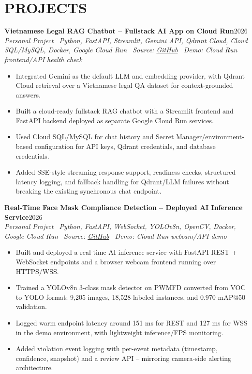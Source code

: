 \documentclass[10pt,a4paper]{article}
\newenvironment{cvitems}{%
    \begin{itemize}[leftmargin=1.2em,itemsep=0pt,topsep=1pt,parsep=0pt]
}{%
    \end{itemize}
}
\newcommand{\entryhead}[2]{%
    \noindent\textbf{#1}\hfill #2\\[-2pt]
}
\newcommand{\entrysub}[1]{%
    \noindent\textit{#1}\\[-1pt]
}
\begin{document}
\section{PROJECTS}
\entryhead{Vietnamese Legal RAG Chatbot -- Fullstack AI App on Cloud Run}{2026}
\entrysub{Personal Project \textbar\ Python, FastAPI, Streamlit, Gemini API, Qdrant Cloud, Cloud SQL/MySQL, Docker, Google Cloud Run \textbar\ Source: \href{https://github.com/NguyenKhacBao564/legal_RaG_Chatbot_VietNamese-System}{GitHub} \textbar\ Demo: Cloud Run frontend/API health check}
\begin{cvitems}
    \item Integrated Gemini as the default LLM and embedding provider, with Qdrant Cloud retrieval over a Vietnamese legal QA dataset for context-grounded answers.
    \item Built a cloud-ready fullstack RAG chatbot with a Streamlit frontend and FastAPI backend deployed as separate Google Cloud Run services.
    \item Used Cloud SQL/MySQL for chat history and Secret Manager/environment-based configuration for API keys, Qdrant credentials, and database credentials.
    \item Added SSE-style streaming response support, readiness checks, structured latency logging, and fallback handling for Qdrant/LLM failures without breaking the existing synchronous chat endpoint.
\end{cvitems}

\entryhead{Real-Time Face Mask Compliance Detection -- Deployed AI Inference Service}{2026}
\entrysub{Personal Project \textbar\ Python, FastAPI, WebSocket, YOLOv8n, OpenCV, Docker, Google Cloud Run \textbar\ Source: \href{https://github.com/NguyenKhacBao564/Real-Time-Face-Mask-Compliance-Detection-System}{GitHub} \textbar\ Demo: Cloud Run webcam/API demo}
\begin{cvitems}
    \item Built and deployed a real-time AI inference service with FastAPI REST + WebSocket endpoints and a browser webcam frontend running over HTTPS/WSS.
    \item Trained a YOLOv8n 3-class mask detector on PWMFD converted from VOC to YOLO format: 9,205 images, 18,528 labeled instances, and 0.970 mAP@50 validation.
    \item Logged warm endpoint latency around 151 ms for REST and 127 ms for WSS in the demo environment, with lightweight inference/FPS monitoring.
    \item Added violation event logging with per-event metadata (timestamp, confidence, snapshot) and a review API -- mirroring camera-side alerting architecture.
\end{cvitems}
\end{document}
